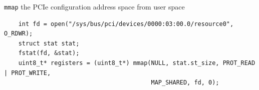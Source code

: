 \documentclass[NET,english,aspectratio=169,notitleframe]{tumbeamer}
\begin{document}
\begin{frame}[fragile=singleslide]{\texttt{mmap} the PCIe configuration address space from user space}
\begin{verbatim}
	int fd = open("/sys/bus/pci/devices/0000:03:00.0/resource0", O_RDWR);
	struct stat stat;
	fstat(fd, &stat);
	uint8_t* registers = (uint8_t*) mmap(NULL, stat.st_size, PROT_READ | PROT_WRITE,
	                                     MAP_SHARED, fd, 0);
\end{verbatim}
\end{frame}
\end{document}
